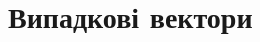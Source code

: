\documentclass{report}
\begin{document}
    \chapter{Випадкові вектори}
        
        
        
        
\end{document}
